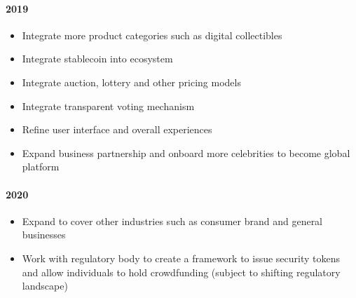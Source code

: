 \documentclass[letterpaper,11pt]{article}
\begin{document}
\paragraph{2019}
\begin{itemize}
\itemsep0em
\item Integrate more product categories such as digital collectibles
\item Integrate stablecoin into ecosystem
\item Integrate auction, lottery and other pricing models
\item Integrate transparent voting mechanism
\item Refine user interface and overall experiences
\item Expand business partnership and onboard more celebrities to become global platform
\end{itemize}
\paragraph{2020}
\begin{itemize}
\itemsep0em
\item Expand to cover other industries such as consumer brand and general businesses
\item Work with regulatory body to create a framework to issue security tokens and allow individuals to hold crowdfunding (subject to shifting regulatory landscape)
\end{itemize}

\newpage



\end{document}
